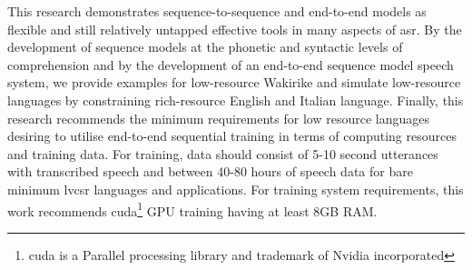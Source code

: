 This research demonstrates sequence-to-sequence and end-to-end models as flexible and still relatively untapped effective tools in many aspects of \acrshort{asr}.  By the development of sequence models at the phonetic and syntactic levels of comprehension and by the development of an end-to-end sequence model speech system, we provide examples for low-resource Wakirike and simulate low-resource languages by constraining rich-resource English and Italian language.   Finally, this research recommends the minimum requirements for low resource languages desiring to utilise end-to-end sequential training in terms of computing resources and training data.  For training, data should consist of 5-10 second utterances with transcribed speech and between 40-80 hours of speech data for bare minimum \acrshort{lvcsr} languages and applications.  For training system requirements, this work recommends \acrshort{cuda}\footnote{\acrfull{cuda} is a Parallel processing library and trademark of Nvidia incorporated} GPU training having at least 8GB RAM.
 
\stopblue



